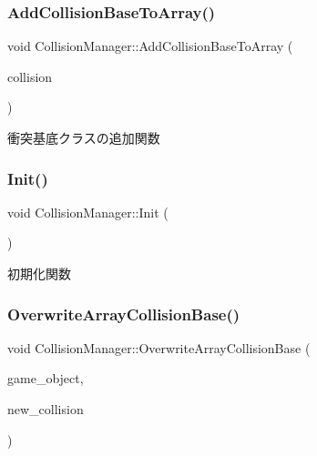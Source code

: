 \subsubsection{\texorpdfstring{Add\+Collision\+Base\+To\+Array()}{AddCollisionBaseToArray()}}
{\footnotesize\ttfamily void Collision\+Manager\+::\+Add\+Collision\+Base\+To\+Array (\begin{DoxyParamCaption}\item[{\mbox{\hyperlink{class_collision_base}{Collision\+Base}} $\ast$}]{collision }\end{DoxyParamCaption})}



衝突基底クラスの追加関数 

\mbox{\label{class_collision_manager_a2c5770b90b7a46a5674df008a7a57145}} 
\subsubsection{\texorpdfstring{Init()}{Init()}}
{\footnotesize\ttfamily void Collision\+Manager\+::\+Init (\begin{DoxyParamCaption}{ }\end{DoxyParamCaption})}



初期化関数 

\mbox{\label{class_collision_manager_af9c2ce87e0189cdd1256c83decc64673}} 
\subsubsection{\texorpdfstring{Overwrite\+Array\+Collision\+Base()}{OverwriteArrayCollisionBase()}}
{\footnotesize\ttfamily void Collision\+Manager\+::\+Overwrite\+Array\+Collision\+Base (\begin{DoxyParamCaption}\item[{\mbox{\hyperlink{class_game_object_base}{Game\+Object\+Base}} $\ast$}]{game\+\_\+object,  }\item[{\mbox{\hyperlink{class_collision_base}{Collision\+Base}} $\ast$}]{new\+\_\+collision }\end{DoxyParamCaption})}



